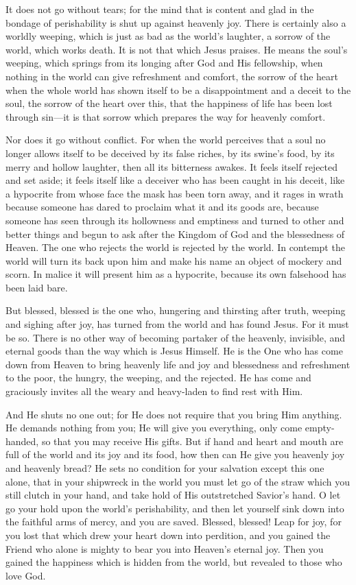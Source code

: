 It does not go without tears; for the mind that is content and glad in the bondage of perishability is shut up against heavenly joy. There is certainly also a worldly weeping, which is just as bad as the world’s laughter, a sorrow of the world, which works death. It is not that which Jesus praises. He means the soul’s weeping, which springs from its longing after God and His fellowship, when nothing in the world can give refreshment and comfort, the sorrow of the heart when the whole world has shown itself to be a disappointment and a deceit to the soul, the sorrow of the heart over this, that the happiness of life has been lost through sin—it is that sorrow which prepares the way for heavenly comfort.

Nor does it go without conflict. For when the world perceives that a soul no longer allows itself to be deceived by its false riches, by its swine’s food, by its merry and hollow laughter, then all its bitterness awakes. It feels itself rejected and set aside; it feels itself like a deceiver who has been caught in his deceit, like a hypocrite from whose face the mask has been torn away, and it rages in wrath because someone has dared to proclaim what it and its goods are, because someone has seen through its hollowness and emptiness and turned to other and better things and begun to ask after the Kingdom of God and the blessedness of Heaven. The one who rejects the world is rejected by the world. In contempt the world will turn its back upon him and make his name an object of mockery and scorn. In malice it will present him as a hypocrite, because its own falsehood has been laid bare.

But blessed, blessed is the one who, hungering and thirsting after truth, weeping and sighing after joy, has turned from the world and has found Jesus. For it must be so. There is no other way of becoming partaker of the heavenly, invisible, and eternal goods than the way which is Jesus Himself. He is the One who has come down from Heaven to bring heavenly life and joy and blessedness and refreshment to the poor, the hungry, the weeping, and the rejected. He has come and graciously invites all the weary and heavy-laden to find rest with Him.

And He shuts no one out; for He does not require that you bring Him anything. He demands nothing from you; He will give you everything, only come empty-handed, so that you may receive His gifts. But if hand and heart and mouth are full of the world and its joy and its food, how then can He give you heavenly joy and heavenly bread? He sets no condition for your salvation except this one alone, that in your shipwreck in the world you must let go of the straw which you still clutch in your hand, and take hold of His outstretched Savior’s hand. O let go your hold upon the world’s perishability, and then let yourself sink down into the faithful arms of mercy, and you are saved. Blessed, blessed! Leap for joy, for you lost that which drew your heart down into perdition, and you gained the Friend who alone is mighty to bear you into Heaven’s eternal joy. Then you gained the happiness which is hidden from the world, but revealed to those who love God.

